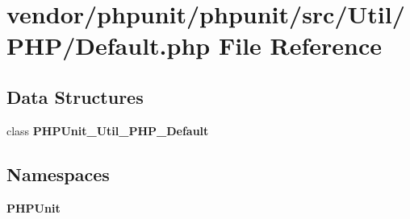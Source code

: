 \section{vendor/phpunit/phpunit/src/\+Util/\+P\+H\+P/\+Default.php File Reference}
\label{_default_8php}
\subsection*{Data Structures}
\begin{DoxyCompactItemize}
\item 
class {\bf P\+H\+P\+Unit\+\_\+\+Util\+\_\+\+P\+H\+P\+\_\+\+Default}
\end{DoxyCompactItemize}
\subsection*{Namespaces}
\begin{DoxyCompactItemize}
\item 
 {\bf P\+H\+P\+Unit}
\end{DoxyCompactItemize}
